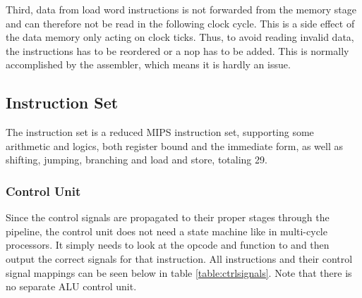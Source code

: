 Third, data from load word instructions is not forwarded from the memory stage and can therefore not be read in the following clock cycle.
This is a side effect of the data memory only acting on clock ticks.
Thus, to avoid reading invalid data, the instructions has to be reordered or a nop has to be added. This is normally accomplished by the assembler, which means it is hardly an issue.

\subsection{Instruction Set}

The instruction set is a reduced MIPS instruction set, supporting some
arithmetic and logics, both register bound and the immediate form, as well as
shifting, jumping, branching and load and store, totaling 29.

\subsubsection*{Control Unit}

Since the control signals are propagated to their proper stages through the pipeline, the control unit does not need a state machine like in multi-cycle processors.
It simply needs to look at the opcode and function to and then output the correct signals for that instruction.
All instructions and their control signal mappings can be seen below in table \ref{table:ctrlsignals}.
Note that there is no separate ALU control unit.

